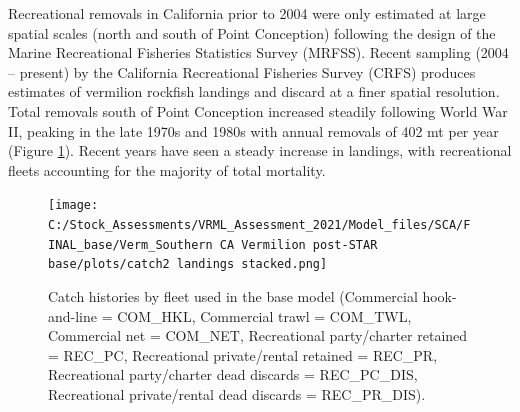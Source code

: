 \documentclass[11pt,
  english,
]{article}
\begin{document}
Recreational removals in California prior to 2004 were only estimated at large spatial scales (north and south of Point Conception) following the design of the Marine Recreational Fisheries Statistics Survey (MRFSS). Recent sampling (2004 -- present) by the California Recreational Fisheries Survey (CRFS) produces estimates of vermilion rockfish landings and discard at a finer spatial resolution. Total removals south of Point Conception increased steadily following World War II, peaking in the late 1970s and 1980s with annual removals of 402 mt per year (Figure \ref{fig:catchES}). Recent years have seen a steady increase in landings, with recreational fleets accounting for the majority of total mortality.

\FloatBarrier

\begin{figure}
\centering
\texttt{[image: C:/Stock\_Assessments/VRML\_Assessment\_2021/Model\_files/SCA/FINAL\_base/Verm\_Southern CA Vermilion post-STAR base/plots/catch2 landings stacked.png]}
\caption{Catch histories by fleet used in the base model (Commercial hook-and-line = COM\_HKL, Commercial trawl = COM\_TWL, Commercial net = COM\_NET, Recreational party/charter retained = REC\_PC, Recreational private/rental retained = REC\_PR, Recreational party/charter dead discards = REC\_PC\_DIS, Recreational private/rental dead discards = REC\_PR\_DIS).\label{fig:catchES}}
\end{figure}
\end{document}
